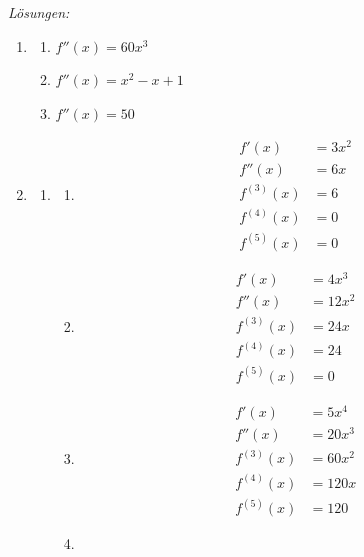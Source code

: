 \clearpage
\emph{Lösungen:}
\begin{enumerate}
	\item
	      \begin{enumerate}
		      \item \( f''(x) = 60x^3 \)
		      \item \( f''(x) = x^2 -x + 1 \)
		      \item \( f''(x) = 50 \)
	      \end{enumerate}

	\item
	      \begin{enumerate}
		      \item
		            \begin{enumerate}
			            \item
			                  \begin{align*}
				                  f'(x)      & = 3x^2 \\
				                  f''(x)     & = 6x   \\
				                  f^{(3)}(x) & = 6    \\
				                  f^{(4)}(x) & = 0    \\
				                  f^{(5)}(x) & = 0
			                  \end{align*}
			            \item
			                  \begin{align*}
				                  f'(x)      & = 4x^3  \\
				                  f''(x)     & = 12x^2 \\
				                  f^{(3)}(x) & = 24x   \\
				                  f^{(4)}(x) & = 24    \\
				                  f^{(5)}(x) & = 0
			                  \end{align*}
			            \item
			                  \begin{align*}
				                  f'(x)      & = 5x^4  \\
				                  f''(x)     & = 20x^3 \\
				                  f^{(3)}(x) & = 60x^2 \\
				                  f^{(4)}(x) & = 120x  \\
				                  f^{(5)}(x) & = 120
			                  \end{align*}
			            \item

\end{enumerate}
\end{enumerate}
\end{enumerate}
